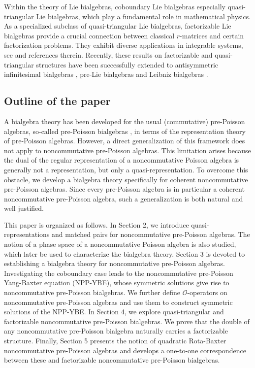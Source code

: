 \documentclass[12pt]{amsart}
\theoremstyle{definition}
\begin{document}
 Within the theory of Lie bialgebras, coboundary Lie bialgebras especially quasi-triangular Lie bialgebras,
 which play a fundamental role in mathematical physics. As a specialized subclass of quasi-triangular Lie bialgebras,
  factorizable Lie bialgebras \cite{Ls} provide a crucial connection between classical $r$-matrices and certain factorization problems.
   They exhibit diverse applications in integrable systems, see \cite{Rs, St} and references therein.
  Recently, these results on factorizable and quasi-triangular structures have been successfully 
   extended to antisymmetric infinitesimal bialgebras \cite{Sw}, pre-Lie bialgebras \cite{Wbl} and Leibniz bialgebras \cite{Bls}.
   
 \subsection{ Outline of the paper}

 A bialgebra theory has been developed for the usual (commutative) pre-Poisson algebras,
 so-called pre-Poisson bialgebras \cite{Zls}, in terms of the representation theory of pre-Poisson algebras.
 However, a direct generalization of this framework does not apply to noncommutative pre-Poisson algebras. 
 This limitation arises because the dual of the regular representation of a noncommutative Poisson algebra 
 is generally not a representation, but only a quasi-representation. To overcome this obstacle, 
 we develop a bialgebra theory specifically for coherent noncommutative pre-Poisson algebras. 
 Since every pre-Poisson algebra is in particular a coherent noncommutative pre-Poisson algebra, 
 such a generalization is both natural and well justified.

This paper is organized as follows. In Section 2, we introduce quasi-representations and matched pairs
 for noncommutative pre-Poisson algebras. The notion of a phase space of 
 a noncommutative Poisson algebra is also studied, which later be used to characterize the bialgebra theory.
  Section 3 is devoted to establishing a bialgebra theory for noncommutative pre-Poisson algebras. 
  Investigating the coboundary case leads to the noncommutative pre-Poisson Yang-Baxter equation (NPP-YBE), 
  whose symmetric solutions give rise to noncommutative pre-Poisson bialgebras.
   We further define $\mathcal{O}$-operators on noncommutative pre-Poisson algebras and
    use them to construct symmetric solutions of the NPP-YBE. 
    In Section 4, we explore quasi-triangular and factorizable noncommutative pre-Poisson bialgebras.
     We prove that the double of any noncommutative pre-Poisson bialgebra 
     naturally carries a factorizable structure. Finally, Section 5 presents the notion of quadratic 
     Rota-Baxter noncommutative pre-Poisson algebras and develops a one-to-one correspondence 
     between these and factorizable noncommutative pre-Poisson bialgebras.
\end{document}
